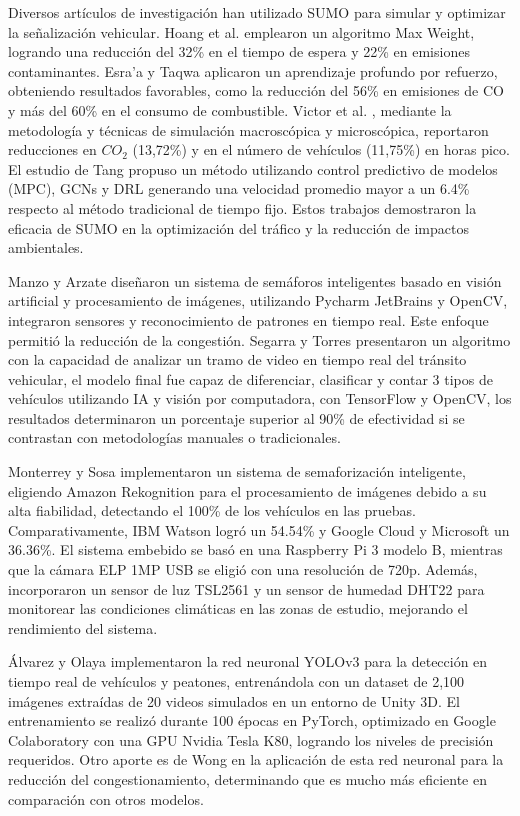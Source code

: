 \documentclass[conference]{IEEEtran}
\begin{document}
Diversos artículos de investigación han utilizado SUMO para simular y optimizar la señalización vehicular. Hoang et al. \cite{Hoang2024} emplearon un algoritmo Max Weight, logrando una reducción del 32\% en el tiempo de espera y 22\% en emisiones contaminantes. Esra’a y Taqwa \cite{Esra2024} aplicaron un aprendizaje profundo por refuerzo, obteniendo resultados favorables, como la reducción del 56\% en emisiones de CO y más del 60\% en el consumo de combustible. Victor et al. \cite{Victor2019}, mediante la metodología y técnicas de simulación macroscópica y microscópica, reportaron reducciones en $CO_2$ (13,72\%) y en el número de vehículos (11,75\%) en horas pico. El estudio de Tang \cite{Tang2024} propuso un método utilizando control predictivo de modelos (MPC), GCNs y DRL generando una velocidad promedio mayor a un 6.4\% respecto al método tradicional de tiempo fijo. Estos trabajos demostraron la eficacia de SUMO en la optimización del tráfico y la reducción de impactos ambientales.

Manzo y Arzate \cite{Manzo2019} diseñaron un sistema de semáforos inteligentes basado en visión artificial y procesamiento de imágenes, utilizando Pycharm JetBrains y OpenCV, integraron sensores y reconocimiento de patrones en tiempo real. Este enfoque permitió la reducción de la congestión. Segarra y Torres\cite{Segarra2022} presentaron un algoritmo con la capacidad de analizar un tramo de video en tiempo real del tránsito vehicular, el modelo final fue capaz de diferenciar, clasificar y contar 3 tipos de vehículos utilizando IA y visión por computadora, con TensorFlow y OpenCV, los resultados determinaron un porcentaje superior al 90\% de efectividad si se contrastan con metodologías manuales o tradicionales.

Monterrey y Sosa \cite{Monterrey2020} implementaron un sistema de semaforización inteligente, eligiendo Amazon Rekognition para el procesamiento de imágenes debido a su alta fiabilidad, detectando el 100\% de los vehículos en las pruebas. Comparativamente, IBM Watson logró un 54.54\% y Google Cloud y Microsoft un 36.36\%. El sistema embebido se basó en una Raspberry Pi 3 modelo B, mientras que la cámara ELP 1MP USB se eligió con una resolución de 720p. Además, incorporaron un sensor de luz TSL2561 y un sensor de humedad DHT22 para monitorear las condiciones climáticas en las zonas de estudio, mejorando el rendimiento del sistema.

Álvarez y Olaya \cite{Alvarez2021} implementaron la red neuronal YOLOv3 para la detección en tiempo real de vehículos y peatones, entrenándola con un dataset de 2,100 imágenes extraídas de 20 videos simulados en un entorno de Unity 3D. El entrenamiento se realizó durante 100 épocas en PyTorch, optimizado en Google Colaboratory con una GPU Nvidia Tesla K80, logrando los niveles de precisión requeridos. Otro aporte es de Wong \cite{Eduardo2024} en la aplicación de esta red neuronal para la reducción del congestionamiento, determinando que es mucho más eficiente en comparación con otros modelos.
\end{document}
